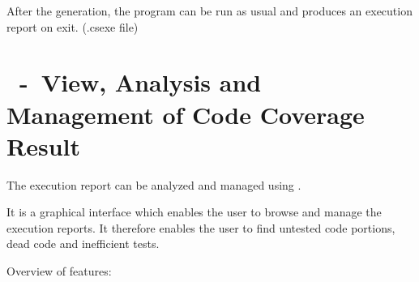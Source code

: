    \par\bigskip
   After the generation, the program can be run as usual 
   and produces an execution report on exit. (.csexe file)


\section{\CoverageBrowser~-~View, Analysis and Management of Code Coverage Result}

   The execution report can be analyzed and managed using \CoverageBrowser.\par
   It is a graphical interface which enables the user to browse 
   and manage the execution reports.
   It therefore enables the user to find untested code portions, 
   dead code and inefficient tests.
   \par
   Overview of features:
